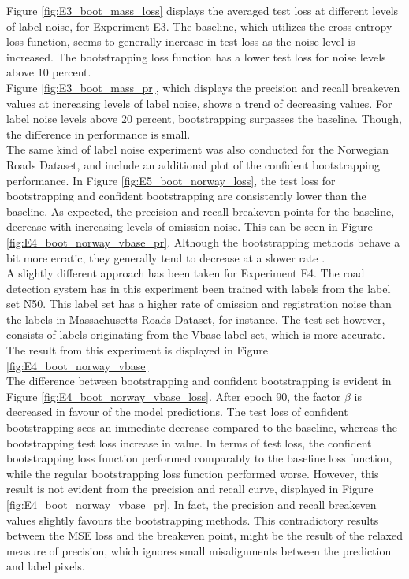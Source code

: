 Figure \ref{fig:E3_boot_mass_loss} displays the averaged test loss at different levels of label noise, for Experiment E3. The baseline, which utilizes the cross-entropy loss function, seems to generally increase in test loss as the noise level is increased. The bootstrapping loss function has a lower test loss for noise levels above 10 percent.\\

Figure \ref{fig:E3_boot_mass_pr}, which displays the precision and recall breakeven values at increasing levels of label noise, shows a trend of decreasing values.  For label noise levels above 20 percent, bootstrapping surpasses the baseline. Though, the difference in performance is small.\\

The same kind of label noise experiment was also conducted for the Norwegian Roads Dataset, and include an additional plot of the confident bootstrapping performance. In Figure \ref{fig:E5_boot_norway_loss}, the test loss for bootstrapping and confident bootstrapping are consistently lower than the baseline. As expected, the precision and recall breakeven points for the baseline, decrease with increasing levels of omission noise. This can be seen in Figure \ref{fig:E4_boot_norway_vbase_pr}. Although the bootstrapping methods behave a bit more erratic, they generally tend to decrease at a slower rate .\\

A slightly different approach has been taken for Experiment E4. The road detection system has in this experiment been trained with labels from the label set N50. This label set has a higher rate of omission and registration noise than the labels in Massachusetts Roads Dataset, for instance. The test set however, consists of labels originating from the Vbase label set, which is more accurate. The result from this experiment is displayed in Figure \ref{fig:E4_boot_norway_vbase}\\

The difference between bootstrapping and confident bootstrapping is evident in Figure \ref{fig:E4_boot_norway_vbase_loss}. After epoch 90, the factor $\beta$ is decreased in favour of the model predictions. The test loss of confident bootstrapping sees an immediate decrease compared to the baseline, whereas the bootstrapping test loss increase in value. In terms of test loss, the confident bootstrapping loss function performed comparably to the baseline loss function, while the regular bootstrapping loss function performed worse. However, this result is not evident from the precision and recall curve, displayed in Figure \ref{fig:E4_boot_norway_vbase_pr}. In fact, the precision and recall breakeven values slightly favours the bootstrapping methods. This contradictory results between the MSE loss and the breakeven point, might be the result of the relaxed measure of precision, which ignores small misalignments between the prediction and label pixels.\\

